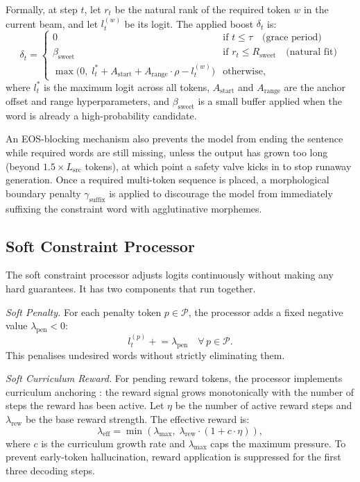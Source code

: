 \documentclass{CUP-JNL-NLP}
\begin{document}
Formally, at step $t$, let $r_t$ be the natural rank of the required token $w$ in
the current beam, and let $l_t^{(w)}$ be its logit. The applied boost $\delta_t$ is:
\begin{equation}
\delta_t = \begin{cases}
    0 & \text{if } t \leq \tau \quad \text{(grace period)} \\[3pt]
    \beta_{\text{sweet}} & \text{if } r_t \leq R_{\text{sweet}} \quad
      \text{(natural fit)} \\[3pt]
    \max\!\bigl(0,\; l_t^{*} + A_{\text{start}} + A_{\text{range}} \cdot \rho -
      l_t^{(w)}\bigr) & \text{otherwise,}
\end{cases}
\label{eq:anchor}
\end{equation}
where $l_t^{*}$ is the maximum logit across all tokens, $A_{\text{start}}$ and
$A_{\text{range}}$ are the anchor offset and range hyperparameters, and
$\beta_{\text{sweet}}$ is a small buffer applied when the word is already a
high-probability candidate.

An EOS-blocking mechanism also prevents the model from ending the sentence while
required words are still missing, unless the output has grown too long (beyond
$1.5 \times L_{\text{src}}$ tokens), at which point a safety valve kicks in to stop
runaway generation. Once a required multi-token sequence is placed, a morphological
boundary penalty $\gamma_{\text{suffix}}$ is applied to discourage the model from
immediately suffixing the constraint word with agglutinative morphemes.

\subsection{Soft Constraint Processor}

The soft constraint processor adjusts logits continuously without making any hard
guarantees. It has two components that run together.

\textit{Soft Penalty.} For each penalty token $p \in \mathcal{P}$, the processor
adds a fixed negative value $\lambda_{\text{pen}} < 0$:
\begin{equation}
    l_t^{(p)} \mathrel{+}= \lambda_{\text{pen}} \quad \forall\, p \in \mathcal{P}.
\end{equation}
This penalises undesired words without strictly eliminating them.

\textit{Soft Curriculum Reward.} For pending reward tokens, the processor implements
curriculum anchoring \citep{bengio2009curriculum}: the reward signal grows
monotonically with the number of steps the reward has been active. Let $\eta$ be the
number of active reward steps and $\lambda_{\text{rew}}$ be the base reward strength.
The effective reward is:
\begin{equation}
    \lambda_{\text{eff}} = \min\!\left(\lambda_{\text{max}},\;
    \lambda_{\text{rew}} \cdot (1 + c \cdot \eta)\right),
\end{equation}
where $c$ is the curriculum growth rate and $\lambda_{\text{max}}$ caps the maximum
pressure. To prevent early-token hallucination, reward application is suppressed for
the first three decoding steps.
\end{document}
